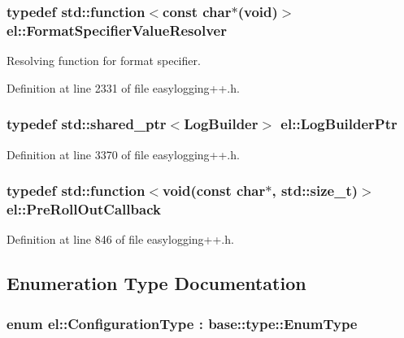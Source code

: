 \subsubsection[{Format\+Specifier\+Value\+Resolver}]{\setlength{\rightskip}{0pt plus 5cm}typedef std\+::function$<$const char$\ast$(void)$>$ {\bf el\+::\+Format\+Specifier\+Value\+Resolver}}\label{namespaceel_ab3cd18425a11df166a041d9024b8b5c6}


Resolving function for format specifier. 



Definition at line 2331 of file easylogging++.\+h.

\hypertarget{namespaceel_ad4c4b2f7d70a4b02568a9f70724a6b39}{}
\subsubsection[{Log\+Builder\+Ptr}]{\setlength{\rightskip}{0pt plus 5cm}typedef std\+::shared\+\_\+ptr$<${\bf Log\+Builder}$>$ {\bf el\+::\+Log\+Builder\+Ptr}}\label{namespaceel_ad4c4b2f7d70a4b02568a9f70724a6b39}


Definition at line 3370 of file easylogging++.\+h.

\hypertarget{namespaceel_aeb764b890a6f3cd41d2726bcd4e9c0cf}{}
\subsubsection[{Pre\+Roll\+Out\+Callback}]{\setlength{\rightskip}{0pt plus 5cm}typedef std\+::function$<$void(const char$\ast$, std\+::size\+\_\+t)$>$ {\bf el\+::\+Pre\+Roll\+Out\+Callback}}\label{namespaceel_aeb764b890a6f3cd41d2726bcd4e9c0cf}


Definition at line 846 of file easylogging++.\+h.



\subsection{Enumeration Type Documentation}
\hypertarget{namespaceel_a281f5db6d6163678bc68a8b23b59e124}{}
\subsubsection[{Configuration\+Type}]{\setlength{\rightskip}{0pt plus 5cm}enum {\bf el\+::\+Configuration\+Type} \+: {\bf base\+::type\+::\+Enum\+Type}\hspace{0.3cm}{\ttfamily [strong]}}\label{namespaceel_a281f5db6d6163678bc68a8b23b59e124}


